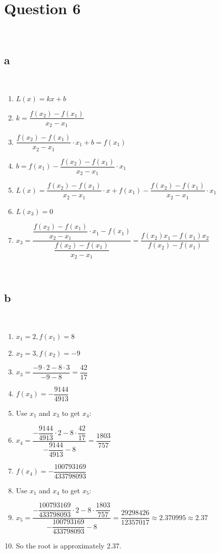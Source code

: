 \documentclass{article}
\begin{document}
\newpage

\section*{Question 6}

~

\subsection*{a}

~

\begin{enumerate}
    \item $L(x)=kx+b$
    \item $k=\dfrac{f(x_2)-f(x_1)}{x_2-x_1}$
    \item $\dfrac{f(x_2)-f(x_1)}{x_2-x_1}\cdot x_1+b=f(x_1)$
    \item $b=f(x_1)-\dfrac{f(x_2)-f(x_1)}{x_2-x_1}\cdot x_1$
    \item $L(x)=\dfrac{f(x_2)-f(x_1)}{x_2-x_1}\cdot x+f(x_1)-\dfrac{f(x_2)-f(x_1)}{x_2-x_1}\cdot x_1$
    \item $L(x_3)=0$
    \item $x_3=\dfrac{\dfrac{f(x_2)-f(x_1)}{x_2-x_1}\cdot x_1-f(x_1)}{\dfrac{f(x_2)-f(x_1)}{x_2-x_1}}=\dfrac{f(x_2)x_1-f(x_1)x_2}{f(x_2)-f(x_1)}$
\end{enumerate}

~

\subsection*{b}

~

\begin{enumerate}
    \item $x_1=2,f(x_1)=8$
    \item $x_2=3,f(x_2)=-9$
    \item $x_3=\dfrac{-9\cdot 2-8\cdot 3}{-9-8}=\dfrac{42}{17}$
    \item $f(x_3)=-\dfrac{9144}{4913}$
    \item Use $x_1$ and $x_3$ to get $x_4$:
    \item $x_4=\dfrac{-\dfrac{9144}{4913}\cdot 2-8\cdot \dfrac{42}{17}}{-\dfrac{9144}{4913}-8}=\dfrac{1803}{757}$
    \item $f(x_4)=-\dfrac{100793169}{433798093}$
    \item Use $x_1$ and $x_4$ to get $x_5$:
    \item $x_5=\dfrac{-\dfrac{100793169}{433798093}\cdot 2-8\cdot \dfrac{1803}{757}}{-\dfrac{100793169}{433798093}-8}=\dfrac{29298426}{12357017}\approx2.370995\approx2.37$
    \item So the root is approximately 2.37.
\end{enumerate}
\end{document}
